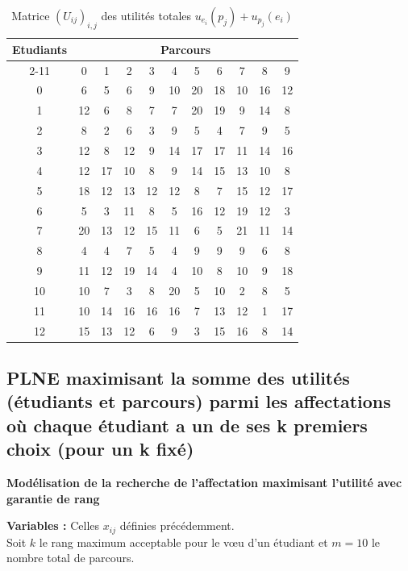 \documentclass{article}
\begin{document}
\begin{table}[htbp]
  \centering
  \caption{Matrice \((U_{ij})_{i,j}\) des utilités totales $u_{e_i}(p_j) + u_{p_j}(e_i)$}
  \label{tab:matrice_utilites}
  \begin{tabular}{c | cccccccccc}
    \toprule
    \multirow{2}{*}{Etudiants} & \multicolumn{10}{c}{Parcours} \\
    \cmidrule(lr){2-11}
       & 0 & 1 & 2 & 3 & 4 & 5 & 6 & 7 & 8 & 9 \\
    \midrule
    0  & 6 & 5 & 6 & 9 & 10 & 20 & 18 & 10 & 16 & 12 \\
    1  & 12 & 6 & 8 & 7 & 7 & 20 & 19 & 9 & 14 & 8 \\
    2  & 8 & 2 & 6 & 3 & 9 & 5 & 4 & 7 & 9 & 5 \\
    3  & 12 & 8 & 12 & 9 & 14 & 17 & 17 & 11 & 14 & 16 \\
    4  & 12 & 17 & 10 & 8 & 9 & 14 & 15 & 13 & 10 & 8 \\
    5  & 18 & 12 & 13 & 12 & 12 & 8 & 7 & 15 & 12 & 17 \\
    6  & 5 & 3 & 11 & 8 & 5 & 16 & 12 & 19 & 12 & 3 \\
    7  & 20 & 13 & 12 & 15 & 11 & 6 & 5 & 21 & 11 & 14 \\
    8  & 4 & 4 & 7 & 5 & 4 & 9 & 9 & 9 & 6 & 8 \\
    9  & 11 & 12 & 19 & 14 & 4 & 10 & 8 & 10 & 9 & 18 \\
    10 & 10 & 7 & 3 & 8 & 20 & 5 & 10 & 2 & 8 & 5 \\
    11 & 10 & 14 & 16 & 16 & 16 & 7 & 13 & 12 & 1 & 17 \\
    12 & 15 & 13 & 12 & 6 & 9 & 3 & 15 & 16 & 8 & 14 \\
    \bottomrule
  \end{tabular}
\end{table}



\newpage
\subsection{PLNE maximisant la somme des utilités (étudiants
et parcours) parmi les affectations où chaque étudiant a un de ses k premiers choix (pour un k fixé)}


\vspace{0.5cm}
\noindent\textbf{Modélisation de la recherche de l'affectation maximisant l'utilité avec garantie de rang}

\vspace{0.3cm}
\noindent\textbf{Variables :} Celles $x_{ij}$ définies précédemment. \\
Soit $k$ le rang maximum acceptable pour le vœu d'un étudiant et $m=10$ le nombre total de parcours.
\end{document}
